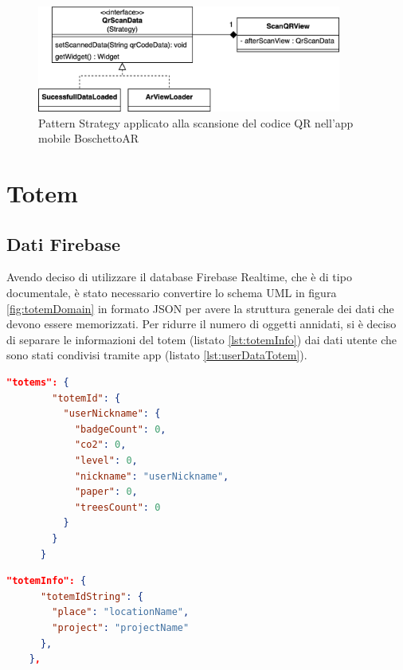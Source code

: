 \begin{figure}
  \centering
  \includegraphics[width=10cm]{img/app/startegyScanQR.png}
  \caption{Pattern Strategy applicato alla scansione del codice QR nell'app mobile BoschettoAR}
  \label{fig:strategyQRScan}
\end{figure}
\section{Totem}
\subsection{Dati Firebase}
Avendo deciso di utilizzare il database Firebase Realtime, che è di tipo documentale, è stato necessario convertire lo schema UML in figura \ref{fig:totemDomain} in formato JSON per avere la struttura generale dei dati che devono essere memorizzati.
Per ridurre il numero di oggetti annidati, si è deciso di separare le informazioni del totem (listato \ref{lst:totemInfo}) dai dati utente che sono stati condivisi tramite app (listato \ref{lst:userDataTotem}).

\begin{lstlisting}[language=json, caption={Esempio di oggetto JSON che memorizza i dati utente per ciascun Totem}, label={lst:userDataTotem}]
      "totems": {
        "totemId": {
          "userNickname": {
            "badgeCount": 0,
            "co2": 0,
            "level": 0,
            "nickname": "userNickname",
            "paper": 0,
            "treesCount": 0
          }
        }
      }
\end{lstlisting}
\break
\begin{lstlisting}[language=json, caption={Esempio di oggetto JSON contenente le informazioni sui totem}, label={lst:totemInfo}]
  "totemInfo": {
      "totemIdString": {
        "place": "locationName",
        "project": "projectName"
      },
    },
\end{lstlisting}  

